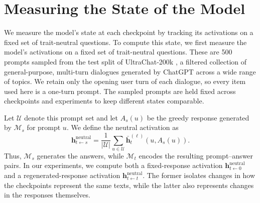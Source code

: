 \section{Measuring the State of the Model}
\label{sec:state}
We measure the model's state at each checkpoint by tracking its activations on a fixed set of trait-neutral questions. To compute this state, we first measure the model's activations on a fixed set of trait-neutral questions. These are 500 prompts sampled from the test split of UltraChat-200k \citep{ding2023enhancingchatlanguagemodels}, a filtered collection of general-purpose, multi-turn dialogues generated by ChatGPT across a wide range of topics. We retain only the opening user turn of each dialogue, so every item used here is a one-turn prompt. The sampled prompts are held fixed across checkpoints and experiments to keep different states comparable.

Let $\mathcal{U}$ denote this prompt set and let $A_s(u)$ be the greedy response generated by $\mathcal{M}_s$ for prompt $u$. We define the neutral activation as
\begin{equation}
\mathbf{h}^{\text{neutral}}_{t\leftarrow s}
=
\frac{1}{|\mathcal{U}|}
\sum_{u\in\mathcal{U}}
\bar{\mathbf{h}}^{(\ell)}_t\!\left(u,A_s(u)\right).
\label{eq:neutral-activation}
\end{equation}
Thus, $\mathcal{M}_s$ generates the answers, while $\mathcal{M}_t$ encodes the resulting prompt--answer pairs. In our experiments, we compute both a fixed-response activation $\mathbf{h}^{\text{neutral}}_{t\leftarrow0}$ and a regenerated-response activation $\mathbf{h}^{\text{neutral}}_{t\leftarrow t}$. The former isolates changes in how the checkpoints represent the same texts, while the latter also represents changes in the responses themselves.

